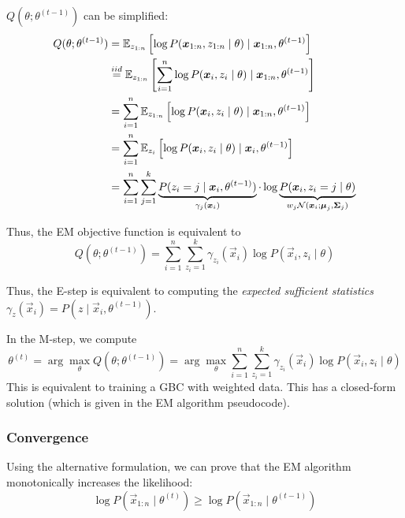 $Q(\theta; \theta^{(t-1)})$ can be simplified:
\begin{align*}
Q(\theta; \theta^{(t-1)}) &=
\mathbb{E}_{z_{1:n}}\left[
\log{P(\boldsymbol{x}_{1:n}, z_{1:n} \mid \theta)} \mid \boldsymbol{x}_{1:n}, \theta^{(t-1)}
\right] \\
&\overset{iid}{=} \mathbb{E}_{z_{1:n}}\left[
\sum_{i=1}^n{
	\log{P(\boldsymbol{x}_i, z_i \mid \theta)} \mid \boldsymbol{x}_{1:n}, \theta^{(t-1)}
}
\right] \\
&= \sum_{i=1}^n{ \mathbb{E}_{z_{1:n}}\left[
	\log{P(\boldsymbol{x}_i, z_i \mid \theta)} \mid \boldsymbol{x}_{1:n}, \theta^{(t-1)}
	\right]
} \\
&= \sum_{i=1}^n{ \mathbb{E}_{z_i}\left[
	\log{P(\boldsymbol{x}_i, z_i \mid \theta)} \mid \boldsymbol{x}_i, \theta^{(t-1)}
	\right]
} \\
&= \sum_{i=1}^n{
	\sum_{j=1}^k{
		\underbrace{P(z_i = j \mid \boldsymbol{x}_i, \theta^{(t-1)})}_{\gamma_j(\boldsymbol{x}_i)}
		\cdot
		\log{\underbrace{P(\boldsymbol{x}_i, z_i = j \mid \theta)}_{w_j \mathcal{N}(\boldsymbol{x}_i; \boldsymbol{\mu}_j, \boldsymbol{\Sigma}_j)}}
	}
}
\end{align*}

Thus, the EM objective function is equivalent to
\begin{equation*}
Q(\theta; \theta^{(t-1)})
= \sum_{i=1}^n{\sum_{z_i=1}^k{
		\gamma_{z_i}(\vec{x}_i)
		\log{P(\vec{x}_i, z_i \mid \theta)}
}}
\end{equation*}

Thus, the E-step is equivalent to computing
the \emph{expected sufficient statistics}
$\gamma_z(\vec{x}_i) = P(z \mid \vec{x}_i, \theta^{(t-1)})$.

In the M-step, we compute
\begin{equation*}
\theta^{(t)} = \arg\max_\theta{
	Q(\theta; \theta^{(t-1)})
}
= \arg\max_\theta{
	\sum_{i=1}^n{
		\sum_{z_i=1}^k{
			\gamma_{z_i}(\vec{x}_i)
			\log{P(\vec{x}_i, z_i \mid \theta)}
		}
	}
}
\end{equation*}
This is equivalent to training a GBC with
weighted data.
This has a closed-form solution
(which is given in the EM algorithm pseudocode).

\subsubsection{Convergence}
Using the alternative formulation,
we can prove that the EM algorithm
monotonically increases the likelihood:
\begin{equation*}
\log{P(\vec{x}_{1:n} \mid \theta^{(t)})}
\geq
\log{P(\vec{x}_{1:n} \mid \theta^{(t-1)})}
\end{equation*}

